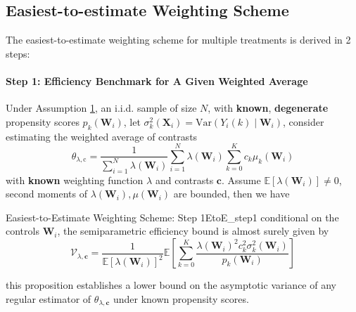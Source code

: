 \documentclass[twoside]{article}
\begin{document}
\subsection{Easiest-to-estimate Weighting Scheme}
The easiest-to-estimate weighting scheme for multiple treatments is derived in 2 steps:

\paragraph*{Step 1: Efficiency Benchmark for A Given Weighted Average}
Under Assumption \hyperref[assumption1]{1}, an i.i.d. sample of size $N$, with \textbf{known}, \textbf{degenerate} propensity scores $p_k(\mathbf{W}_i)$, let $\sigma^2_k(\mathbf{X}_i) = \mathrm{Var}\left( Y_i(k)\mid\mathbf{W}_i \right)$, consider estimating the weighted average of contrasts 
$$
\theta_{\lambda,\mathrm{c}} = \frac{1}{\sum^N_{i=1}\lambda(\mathbf{W}_i)} \sum^N_{i=1}\lambda(\mathbf{W}_i) \sum^K_{k=0}c_k\mu_k(\mathbf{W}_i)
$$
with \textbf{known} weighting function $\lambda$ and contrasts $\mathbf{c}$. Assume $\mathbb{E}\left[\lambda(\mathbf{W}_i)\right] \neq 0$, second moments of $\lambda(\mathbf{W}_i),\mu(\mathbf{W}_i)$ are bounded, then we have 
\begin{proposition}{Easiest-to-Estimate Weighting Scheme: Step 1}{EtoE_step1}
    conditional on the controls $\mathbf{W}_i$, the semiparametric efficiency bound is almost surely given by 
    \begin{equation}\label{eq:semipara_eff_bound}
        \mathcal{V}_{\lambda,\mathbf{c}} = \frac{1}{\mathbb{E}\left[\lambda(\mathbf{W}_i)\right]^2} \mathbb{E}\left[ \sum^K_{k=0} \frac{\lambda(\mathbf{W}_i)^2 c_k^2 \sigma^2_k (\mathbf{W}_i) }{p_k(\mathbf{W}_i)} \right]
    \end{equation}
\end{proposition}
this proposition establishes a lower bound on the asymptotic variance of any regular estimator of $\theta_{\lambda,\mathbf{c}}$ under known propensity scores.
\end{document}
